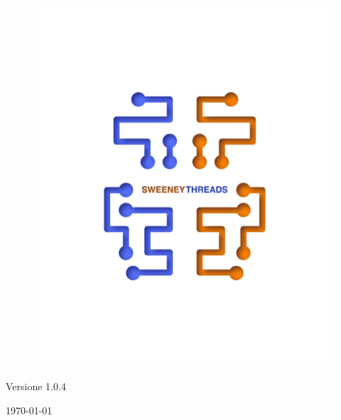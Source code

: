 \documentclass[a4paper]{report}
\begin{document}
\begin{titlepage}
		\begin{figure}[h!]
			\centering
			\includegraphics[scale=0.8]{sweeney.png}
		\end{figure}
		\begin{center}
			Versione 1.0.4
		\end{center}
		{\large \today}\\[3cm] 
		\vfill  
	\end{titlepage}
	
	
	\tableofcontents
	
\end{document}
